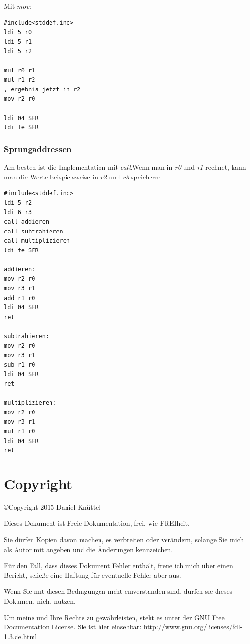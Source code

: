 \documentclass[a4paper,12pt,oneside]{scrreprt}
\begin{document}
Mit \textit{mov}:

\begin{lstlisting}[frame=single]
#include<stddef.inc>
ldi 5 r0
ldi 5 r1
ldi 5 r2

mul r0 r1
mul r1 r2
; ergebnis jetzt in r2
mov r2 r0

ldi 04 SFR
ldi fe SFR
\end{lstlisting}

\section{Sprungaddressen}

Am besten ist die Implementation mit \textit{call}.Wenn man in \textit{r0} und \textit{r1} rechnet, kann man die Werte beispielsweise in \textit{r2} und \textit{r3} speichern:

\begin{lstlisting}[frame=single]
#include<stddef.inc>
ldi 5 r2
ldi 6 r3
call addieren
call subtrahieren
call multiplizieren
ldi fe SFR

addieren:
mov r2 r0
mov r3 r1
add r1 r0
ldi 04 SFR
ret

subtrahieren:
mov r2 r0
mov r3 r1
sub r1 r0
ldi 04 SFR
ret

multiplizieren:
mov r2 r0
mov r3 r1
mul r1 r0
ldi 04 SFR
ret
\end{lstlisting}

\part{Copyright}

\copyright Copyright 2015 Daniel Knüttel

Dieses Dokument ist Freie Dokumentation, frei, wie FREIheit.

Sie dürfen Kopien davon machen, es verbreiten oder verändern, solange Sie mich als Autor mit angeben und die Änderungen kennzeichen.

Für den Fall, dass dieses Dokument Fehler enthält, freue ich mich über einen Bericht, scließe eine Haftung für eventuelle Fehler aber aus.

Wenn Sie mit diesen Bedingungen nicht einverstanden sind, dürfen sie dieses Dokument nicht nutzen.

Um meine und Ihre Rechte zu gewährleisten, steht es unter der GNU Free Documentation License. Sie ist hier einsehbar: \url{http://www.gnu.org/licenses/fdl-1.3.de.html}
\end{document}
